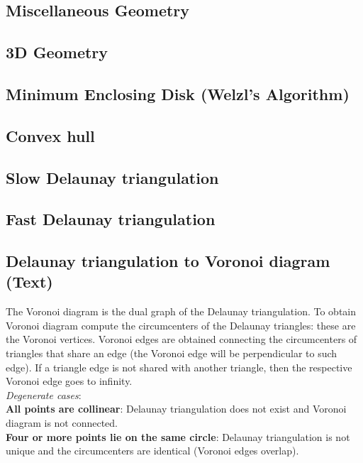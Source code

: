 \documentclass[9pt]{extarticle}
\begin{document}
\begin{multicols*}{3}
\subsection{Miscellaneous Geometry} %


\subsection{3D Geometry}


\subsection{Minimum Enclosing Disk (Welzl's Algorithm)} %


\subsection{Convex hull} %


\subsection{Slow Delaunay triangulation} %


\subsection{Fast Delaunay triangulation}


\subsection{Delaunay triangulation to Voronoi diagram (Text)}
The Voronoi diagram is the dual graph of the Delaunay triangulation.
To obtain Voronoi diagram compute the circumcenters of the Delaunay triangles:
these are the Voronoi vertices. Voronoi edges are obtained connecting
the circumcenters of triangles that share an edge (the Voronoi edge will be
perpendicular to such edge). If a triangle edge is not shared with another triangle,
then the respective Voronoi edge goes to infinity. \\
\textit{Degenerate cases}: \\
\textbf{All points are collinear}: Delaunay triangulation does not exist and Voronoi diagram
is not connected. \\
\textbf{Four or more points lie on the same circle}: Delaunay triangulation is not unique and
the circumcenters are identical (Voronoi edges overlap).


\end{multicols*}
\end{document}
